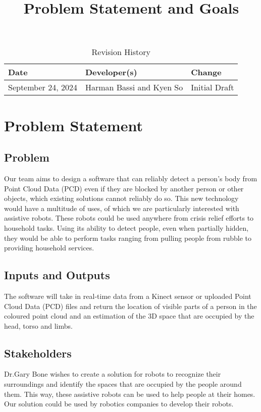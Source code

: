 \documentclass{article}
\title{Problem Statement and Goals\\\progname}
\author{\authname}
\date{}
\begin{document}
\maketitle

\begin{table}[hp]
\caption{Revision History} \label{TblRevisionHistory}
\begin{tabularx}{\textwidth}{llX}
\toprule
\textbf{Date} & \textbf{Developer(s)} & \textbf{Change}\\
\midrule
September 24, 2024 & Harman Bassi and Kyen So & Initial Draft\\
\bottomrule
\end{tabularx}
\end{table}

\newpage

\section{Problem Statement}

\subsection{Problem}
Our team aims to design a software that can reliably detect a person’s body from Point Cloud Data (PCD) even if they are blocked by another person or other objects, which existing solutions cannot reliably do so. This new technology would have a multitude of uses, of which we are particularly interested with assistive robots. These robots could be used anywhere from crisis relief efforts to household tasks. Using its ability to detect people, even when partially hidden, they would be able to perform tasks ranging from pulling people from rubble to providing household services. 

\subsection{Inputs and Outputs}
The software will take in real-time data from a Kinect sensor or uploaded Point Cloud Data (PCD) files and return the location of visible parts of a person in the coloured point cloud and an estimation of the 3D space that are occupied by the head, torso and limbs.

\subsection{Stakeholders}
Dr.Gary Bone wishes to create a solution for robots to recognize their surroundings and identify the spaces that are occupied by the people around them. This way, these assistive robots can be used to help people at their homes. Our solution could be used by robotics companies to develop their robots.
\end{document}
